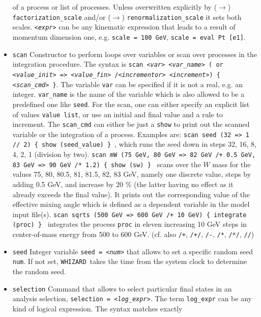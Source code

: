 \documentclass[12pt]{book}
\newcommand{\ttt}[1]{\texttt{#1}}
\newcommand{\whizard}{\texttt{WHIZARD}}
\begin{document}
\begin{itemize}
of a process or list of processes. Unless overwritten explicitly by
($\to$) \ttt{factorization\_scale} and/or ($\to$)
\ttt{renormalization\_scale} it sets both scales. \ttt{{\em <expr>}} can be
any kinematic expression that leads to a result of momentum dimension
one, e.g. \ttt{scale = 100 GeV}, \ttt{scale = eval Pt [e1]}. 
\item
\ttt{scan} \newline
Constructor to perform loops over variables or scan over processes in
the integration procedure. The syntax is \ttt{scan {\em <var>} {\em <var\_name>}
  ({\em <value list>} or  {\em <value\_init>} => {\em <value\_fin>} /{\em <incrementor>}
  {\em <increment>}) \{ {\em <scan\_cmd>} \}}. The variable \ttt{var} can be
specified if it is not a real, e.g. an integer. \ttt{var\_name} is the
name of the variable which is also allowed to be a predefined one like
\ttt{seed}. For the scan, one can either specify an explicit list of
values \ttt{value list}, or use an initial and final value and a
rule to increment. The \ttt{scan\_cmd}  can either be just a
\ttt{show} to print out the scanned variable or the integration of a process.
Examples are: \ttt{scan seed (32 => 1 // 2) \{ show (seed\_value) \}
}, which runs the seed down in steps 32, 16, 8, 4, 2, 1 (division by
two). \ttt{scan mW (75 GeV, 80 GeV => 82 GeV /+ 0.5 GeV,  83 GeV => 90
GeV /* 1.2) \{ show (sw) \} } scans over the $W$ mass for the values
75, 80, 80.5, 81, 81.5, 82, 83 GeV, namely one discrete value, steps
by adding 0.5 GeV, and increase by 20 \% (the latter having no effect 
as it already exceeds the final value). It prints out the
corresponding value of the effective mixing angle which is defined as
a dependent variable in the model input file(s). \ttt{scan sqrts (500 GeV =>
  600 GeV /+ 10 GeV) \{ integrate (proc) \} } integrates the process
\ttt{proc} in eleven increasing 10 GeV steps in center-of-mass energy
from 500 to 600 GeV. (cf. also \ttt{/+}, \ttt{/+/}, \ttt{/-},
\ttt{/*}, \ttt{/*/}, \ttt{//})
\item
\ttt{seed} \newline 
Integer variable \ttt{seed = {\em <num>}} that allows to set a specific
random seed \ttt{num}. If not set, \whizard\ takes the time from the 
system clock to determine the random seed.
\item
\ttt{selection} \newline
Command that allows to select particular final states in an analysis
selection, \ttt{selection = {\em <log\_expr>}}. The term \ttt{log\_expr} can
be any kind of logical expression. The syntax matches exactly

\end{itemize}
\end{document}

